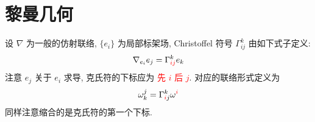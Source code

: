 \chapter{黎曼几何}
    设 $\nabla$ 为一般的仿射联络, $\{e_i\}$ 为局部标架场, 
    Christoffel 符号 $\Gamma_{ij}^k$ 由如下式子定义:
    \begin{equation*}
        \nabla_{e_i}e_j=\Gamma_{\textcolor{red}{ij}}^ke_k
    \end{equation*}
    注意 $e_j$ 关于 $e_i$ 求导, 克氏符的下标应为 \textcolor{red}{先 $i$ 后 $j$}. 
    对应的联络形式定义为
    \begin{equation*}
        \omega^j_k=\Gamma_{\textcolor{red}{i}j}^k\omega^{\textcolor{red}{i}}
    \end{equation*}
    同样注意缩合的是克氏符的第一个下标.
